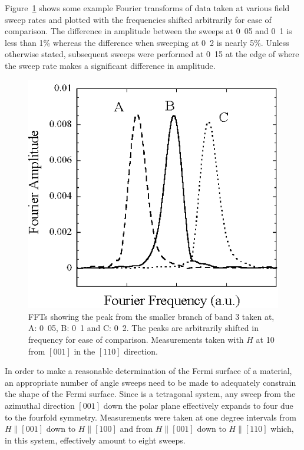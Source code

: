 Figure~\ref{Fig:ResD:ComparisonSweepRates} shows some example Fourier transforms of data taken at various field sweep rates and plotted with the frequencies shifted arbitrarily for ease of comparison. The difference in amplitude between the sweeps at \unit{0.05}{\tesla\reciprocal\minute} and \unit{0.1}{\tesla\reciprocal\minute} is less than \unit{1}{\%} whereas the difference when sweeping at \unit{0.2}{\tesla\reciprocal\minute} is nearly \unit{5}{\%}. Unless otherwise stated, subsequent sweeps were performed at \unit{0.15}{\tesla\reciprocal\minute} at the edge of where the sweep rate makes a significant difference in amplitude.

\begin{figure}[htbp]
    \begin{center}
        \includegraphics[scale=0.9]{Chapter-dHvABaFe2P2/Figures/AngleDepMeasurements/SweepRateComparison/SweepRateComparison}
        \caption{\acp{FFT} showing the peak from the smaller branch of band $3$ taken at, A: \unit{0.05}{\tesla\reciprocal\minute}, B: \unit{0.1}{\tesla\reciprocal\minute} and C: \unit{0.2}{\tesla\reciprocal\minute}. The peaks are arbitrarily shifted in frequency for ease of comparison. Measurements taken with $H$ at \unit{10}{\degree} from $[001]$ in the $[110]$ direction.}
        \label{Fig:ResD:ComparisonSweepRates}
    \end{center}
\end{figure}

In order to make a reasonable determination of the Fermi surface of a material, an appropriate number of angle sweeps need to be made to adequately constrain the shape of the Fermi surface. Since \BaFeP is a tetragonal system, any sweep from the azimuthal direction $[001]$ down the polar plane effectively expands to four due to the fourfold symmetry. Measurements were taken at one degree intervals from $H\parallel[001]$ down to $H\parallel[100]$ and from $H\parallel[001]$ down to $H\parallel[110]$ which, in this system, effectively amount to eight sweeps.

